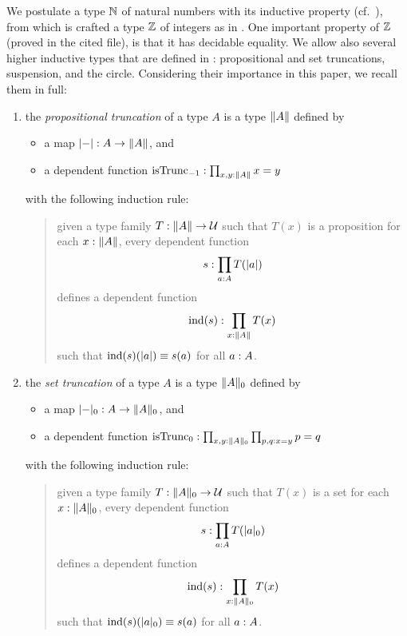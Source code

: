 \documentclass[english,a4paper]{lmcs}
\def\githubpath{\tt\small}
\begin{document}
We postulate a type $\mathbb{N}$ of natural numbers with its inductive property
(cf.~\cite[Ch.~1.9]{HoTT}), from which is crafted a type $\mathbb{Z}$ of integers
as in \cite[\githubpath core/lib/types/Int.agda]{hott-agda}. One important
property of $\mathbb{Z}$ (proved in the cited file), is that it has decidable
equality. We allow also several higher inductive types that are defined in
\cite{HoTT}: propositional and set truncations, suspension, and the circle.
Considering their importance in this paper, we recall them in full:
\begin{enumerate}
\item the \emph{propositional truncation} of a type $A$ is a type $\lVert A\rVert$
  defined by
  \begin{itemize}
  \item a map $\lvert\mathord{{-}}\rvert : A \to \lVert A\rVert$, and
  \item a dependent function
    $\mathrm{isTrunc}_{-1} : \prod_{x,y: \lVert A\rVert} x=y$
  \end{itemize}
  with the following induction rule:
  \begin{quote}
    given a type family $T: \lVert A\rVert \to \mathcal{U}$ such that
    $T(x)$ is a proposition for each $x: \lVert A\rVert$, every
    dependent function
    \begin{displaymath}
      s: \prod_{a: A}T(\lvert a\rvert)
    \end{displaymath}
    defines a dependent function
    \begin{displaymath}
      \operatorname{\mathrm{ind}}(s):\prod_{x: \lVert A\rVert} T(x)
    \end{displaymath}
    such that $\operatorname{\mathrm{ind}}(s)(\lvert a\rvert) \equiv s(a)$ for all $a: A$.
  \end{quote}
\item the \emph{set truncation} of a type $A$ is a type $\lVert A\rVert_0$
  defined by
  \begin{itemize}
  \item a map $\lvert\mathord{{-}}\rvert_0 : A \to \lVert A\rVert_0$, and
  \item a dependent function
    $\mathrm{isTrunc}_{0} : \prod_{x,y: \lVert A\rVert_0}\prod_{p,q: x=y} p = q$
  \end{itemize}
  with the following induction rule:
  \begin{quote}
    given a type family $T: \lVert A\rVert_0 \to \mathcal{U}$ such that
    $T(x)$ is a set for each $x: \lVert A\rVert_0$, every
    dependent function
    \begin{displaymath}
      s: \prod_{a: A}T(\lvert a\rvert_0)
    \end{displaymath}
    defines a dependent function
    \begin{displaymath}
      \operatorname{\mathrm{ind}}(s):\prod_{x: \lVert A\rVert_0} T(x)
    \end{displaymath}
    such that $\operatorname{\mathrm{ind}}(s)(\lvert a\rvert_0) \equiv s(a)$ for all $a: A$.
  \end{quote}


\end{enumerate}
\end{document}

